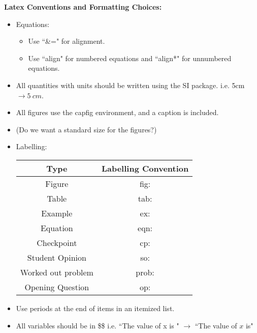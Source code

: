 \documentclass[11pt]{article}
\begin{document}
\textbf{Latex Conventions and Formatting Choices:}\\
\begin{itemize}
\item Equations:
\begin{itemize}
\item Use ``\&=" for alignment.
\item Use ``align" for numbered equations and ``align*" for unnumbered equations.
\end{itemize}
\item All quantities with units should be written using the SI package. i.e. 5cm $\rightarrow \SI{5}{cm}$.
\item All figures use the capfig environment, and a caption is included.
\item (Do we want a standard size for the figures?)
\item Labelling:
\begin{table}[h!]
\centering
\begin{tabular}{|c|c|}
\hline
\textbf{Type}      & \textbf{Labelling Convention} \\ \hline
Figure             & fig:                          \\ \hline
Table              & tab:                          \\ \hline
Example            & ex:                           \\ \hline
Equation           & eqn:                          \\ \hline
Checkpoint         & cp:                           \\ \hline
Student Opinion    & so:                           \\ \hline
Worked out problem & prob:                         \\ \hline
Opening Question   & op:                           \\ \hline
\end{tabular}
\end{table}
\item Use periods at the end of items in an itemized list.
\item All variables should be in \$\$ i.e. ``The value of  x is " $\rightarrow$ ``The value of $x$ is"



\end{itemize}
\end{document}
